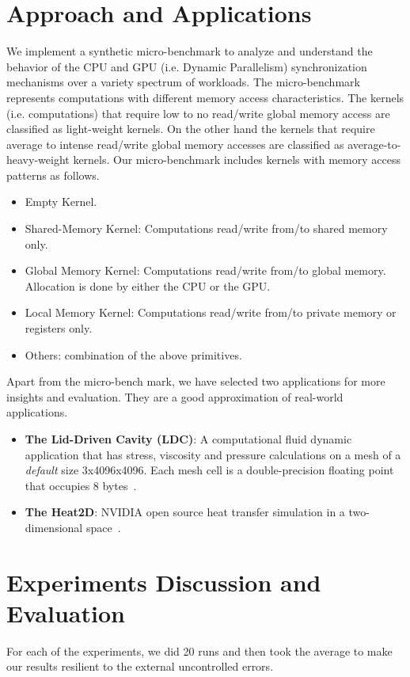 \documentclass[conference]{IEEEtran}
\begin{document}
\section{Approach and Applications}
\label{sec:approach_app}
We implement a synthetic micro-benchmark to analyze and understand the behavior of the CPU and GPU (i.e. Dynamic Parallelism) synchronization mechanisms over a variety spectrum of workloads.  The micro-benchmark represents computations with different memory access characteristics. The kernels (i.e. computations) that require low to no read/write global memory access are classified as light-weight kernels. On the other hand the kernels that require average to intense read/write global memory accesses are classified as average-to-heavy-weight kernels. Our micro-benchmark includes kernels with memory access patterns as follows.  
\begin{itemize}
	\item
	Empty Kernel.
	\item
	Shared-Memory Kernel: Computations read/write from/to shared memory only.
	\item
	Global Memory Kernel: Computations read/write from/to global memory. Allocation is done by either the CPU or the GPU.
	\item
	Local Memory Kernel: Computations read/write from/to private memory or registers only.
	\item
	Others: combination of the above primitives. 
\end{itemize}

Apart from the micro-bench mark, we have selected two applications for more insights and evaluation. They are a good approximation of real-world applications.  

\begin{itemize}
	\item
	\textbf{The Lid-Driven Cavity (LDC)}: A computational fluid dynamic application that has stress, viscosity and pressure calculations on a mesh of a \emph{default} size 3x4096x4096. Each mesh cell is a double-precision floating point that occupies 8 bytes~\cite{cfd_blk_size}.
	\item
	\textbf{The Heat2D}: NVIDIA open source heat transfer simulation in a two-dimensional space~\cite{heat_code}. 
\end{itemize}

\section{Experiments Discussion and Evaluation}
\label{sec:eval}
For each of the experiments, we did 20 runs and then took the average to make our results resilient to the external uncontrolled errors. 
\end{document}
